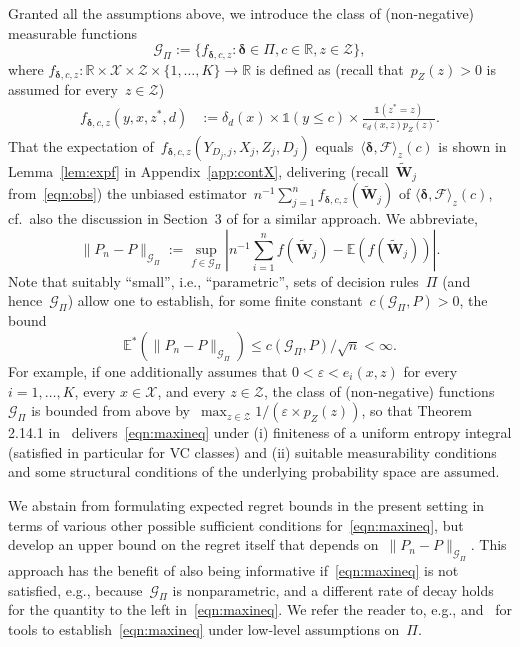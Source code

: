 \documentclass[11pt, a4paper]{article}
\newcommand{\R}{\mathbb{R}}
\newcommand{\eps}{\varepsilon}
\theoremstyle{definition}
\begin{document}
Granted all the assumptions above, we introduce the class of (non-negative) measurable functions~$$\mathcal{G}_{\Pi} := \{f_{\bm{\delta}, c, z}:\bm{\delta} \in \Pi, c \in \R, z\in\mathcal{Z} \},$$ where $f_{\bm{\delta}, c, z} : \R \times \mathcal{X} \times \mathcal{Z} \times \{1, \hdots, K\} \to \R$ is defined as (recall that~$p_Z(z) > 0$ is assumed for every~$z \in \mathcal{Z}$)
\begin{align*}f_{\bm{\delta}, c, z} (y, x, z^*, d) &:=   \delta_d(x) \times \mathds{1}(y \leq c) \times \frac{\mathds{1}( z^* = z)}{e_d(x, z)p_Z(z)}.
\end{align*}
That the expectation of~$f_{\bm{\delta}, c, z}(Y_{D_j, j}, X_j, Z_j, D_j)$ equals~$\langle \bm{\delta}, \mathcal{F} \rangle_z(c)$ is shown in Lemma~\ref{lem:expf} in Appendix~\ref{app:contX}, delivering (recall~$\tilde{\bm{W}}_j$ from~\eqref{eqn:obs}) the unbiased estimator~$n^{-1} \sum_{j = 1}^n f_{\bm{\delta}, c, z}(\tilde{\bm{W}}_j)$  of $\langle \bm{\delta}, \mathcal{F} \rangle_z(c)$, cf.~also the discussion in Section~3 of \cite{kitagawa2019equality} for a similar approach.
%
We abbreviate, $$\| P_n - P \|_{\mathcal{G}_{\Pi}} := \sup_{f \in \mathcal{G}_{\Pi}} |n^{-1} \sum_{i = 1}^n f(\tilde{\bm{W}}_j) - \mathbb{E}(f(\tilde{\bm{W}}_j))|.$$ 
%
Note that suitably ``small'', i.e., ``parametric'', sets of decision rules~$\Pi$ (and hence~$\mathcal{G}_{\Pi}$) allow one to establish, for some finite constant~$c(\mathcal{G}_{\Pi}, P) > 0$, the bound
%
\begin{equation}\label{eqn:maxineq}
\mathbb{E}^*(\| P_n - P \|_{\mathcal{G}_{\Pi}}) \leq c(\mathcal{G}_{\Pi}, P)/\sqrt{n} < \infty.
\end{equation}
%
For example, if one additionally assumes that $0 < \eps < e_i(x, z)$ for every $i = 1, \hdots, K$, every $x \in \mathcal{X}$, and every $z \in \mathcal{Z}$, the class of (non-negative) functions~$\mathcal{G}_{\Pi}$ is bounded from above by~$\max_{z \in \mathcal{Z}} 1/(\eps \times p_Z(z))$, so that Theorem 2.14.1 in~\cite{vdVW} delivers~\eqref{eqn:maxineq} under (i) finiteness of a uniform entropy integral (satisfied in particular for VC classes) and (ii) suitable measurability conditions and some structural conditions of the underlying probability space are assumed.

We abstain from formulating expected regret bounds in the present setting in terms of various other possible sufficient conditions for~\eqref{eqn:maxineq}, but develop an upper bound on the regret itself that depends on~$\| P_n - P \|_{\mathcal{G}_{\Pi}}$. This approach has the benefit of also being informative if~\eqref{eqn:maxineq} is not satisfied, e.g., because~$\mathcal{G}_{\Pi}$ is nonparametric, and a different rate of decay holds for the quantity to the left in~\eqref{eqn:maxineq}. We refer the reader to, e.g., \cite{vdVW} and~\cite{gn} for tools to establish~\eqref{eqn:maxineq} under low-level assumptions on~$\Pi$. 
\end{document}
